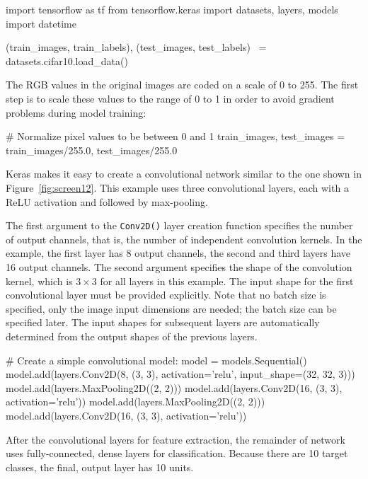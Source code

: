 \begin{pythoncode}
import tensorflow as tf
from tensorflow.keras import datasets, layers, models
import datetime

(train_images, train_labels), (test_images, test_labels) \
    = datasets.cifar10.load_data()
\end{pythoncode}

The RGB values in the original images are coded on a scale of 0 to 255. The first step is to scale these values to the range of 0 to 1 in order to avoid gradient problems during model training:

\begin{pythoncode}
# Normalize pixel values to be between 0 and 1
train_images, test_images = train_images/255.0, test_images/255.0
\end{pythoncode}

Keras makes it easy to create a convolutional network similar to the one shown in Figure~\ref{fig:screen12}. This example uses three convolutional layers, each with a ReLU activation and followed by max-pooling. 

The first argument to the \texttt{Conv2D()} layer creation function specifies the number of output channels, that is, the number of independent convolution kernels. In the example, the first layer has 8 output channels, the second and third layers have 16 output channels. The second argument specifies the shape of the convolution kernel, which is $3 \times 3$ for all layers in this example. The input shape for the first convolutional layer must be provided explicitly. Note that no batch size is specified, only the image input dimensions are needed; the batch size can be specified later. The input shapes for subsequent layers are automatically determined from the output shapes of the previous layers.

\begin{pythoncode}
# Create a simple convolutional model:
model = models.Sequential()
model.add(layers.Conv2D(8, (3, 3), activation='relu', 
    input_shape=(32, 32, 3)))
model.add(layers.MaxPooling2D((2, 2)))
model.add(layers.Conv2D(16, (3, 3), activation='relu'))
model.add(layers.MaxPooling2D((2, 2)))
model.add(layers.Conv2D(16, (3, 3), activation='relu'))
\end{pythoncode}

After the convolutional layers for feature extraction, the remainder of network uses fully-connected, dense layers for classification. Because there are 10 target classes, the final, output layer has 10 units.

